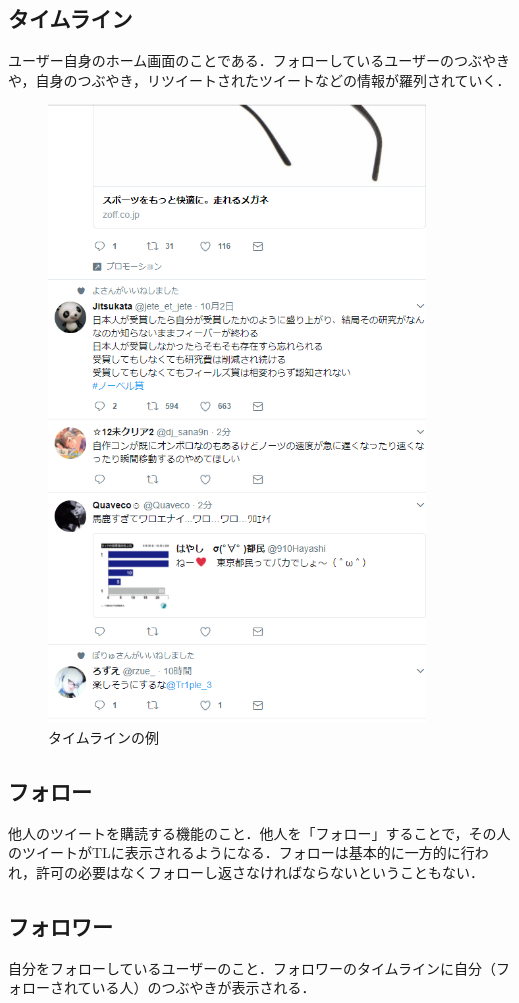 \subsection{タイムライン}
ユーザー自身のホーム画面のことである．フォローしているユーザーのつぶやきや，自身のつぶやき，リツイートされたツイートなどの情報が羅列されていく．
\begin{figure}[htb]
\centering
\includegraphics[width=10cm]{03.png}
\caption{タイムラインの例}\label{3}
\end{figure}
\clearpage

\subsection{フォロー}
他人のツイートを購読する機能のこと．他人を「フォロー」することで，その人のツイートがTLに表示されるようになる．フォローは基本的に一方的に行われ，許可の必要はなくフォローし返さなければならないということもない．

\subsection{フォロワー}
自分をフォローしているユーザーのこと．フォロワーのタイムラインに自分（フォローされている人）のつぶやきが表示される．

